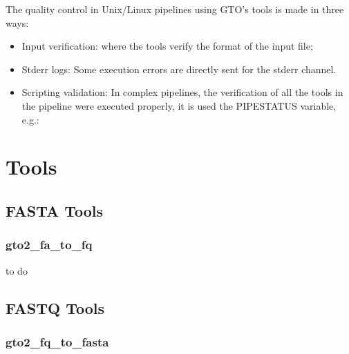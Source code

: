 \documentclass[11pt,]{krantz}
\makeatletter
\newenvironment{Shaded}{\begin{snugshade}}{\end{snugshade}}
\newcommand{\KeywordTok}[1]{\textcolor[rgb]{0.27,0.27,0.27}{\textbf{#1}}}
\newcommand{\StringTok}[1]{\textcolor[rgb]{0.5,0.5,0.5}{#1}}
\newcommand{\VariableTok}[1]{\textcolor[rgb]{0,0,0}{#1}}
\newcommand{\OperatorTok}[1]{\textcolor[rgb]{0.43,0.43,0.43}{\textbf{#1}}}
\newcommand{\BuiltInTok}[1]{#1}
\newcommand{\ExtensionTok}[1]{#1}
\newcommand{\NormalTok}[1]{#1}
\newenvironment{kframe}{%
\medskip{}
\setlength{\fboxsep}{.8em}
 \def\at@end@of@kframe{}%
 \ifinner\ifhmode%
  \def\at@end@of@kframe{\end{minipage}}%
  \begin{minipage}{\columnwidth}%
 \fi\fi%
 \def\FrameCommand##1{\hskip\@totalleftmargin \hskip-\fboxsep
 \colorbox{shadecolor}{##1}\hskip-\fboxsep
     \hskip-\linewidth \hskip-\@totalleftmargin \hskip\columnwidth}%
 \MakeFramed {\advance\hsize-\width
   \@totalleftmargin\z@ \linewidth\hsize
   \@setminipage}}%
 {\par\unskip\endMakeFramed%
 \at@end@of@kframe}
\renewenvironment{Shaded}{\begin{kframe}}{\end{kframe}}
\makeatother
\begin{document}
The quality control in Unix/Linux pipelines using GTO's tools is made in three ways:

\begin{itemize}
\item
  Input verification: where the tools verify the format of the input file;
\item
  Stderr logs: Some execution errors are directly sent for the stderr channel.
\item
  Scripting validation: In complex pipelines, the verification of all the tools in the pipeline were executed properly, it is used the PIPESTATUS variable, e.g.:

\begin{Shaded}
\end{Shaded}
\end{itemize}

\part{Tools}\label{part-tools}

\chapter{FASTA Tools}\label{fasta-tools}

\section{gto2\_fa\_to\_fq}\label{gto2_fa_to_fq}

to do

\chapter{FASTQ Tools}\label{fastq-tools}

\section{gto2\_fq\_to\_fasta}\label{gto2_fq_to_fasta}
\end{document}
